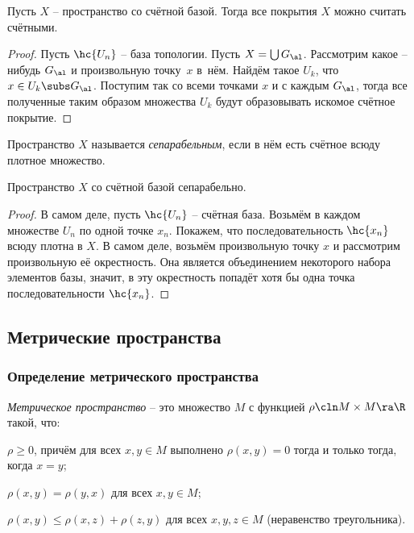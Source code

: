 \documentclass[a4paper]{article}
\begin{document}
\begin{stm}
Пусть $X$ -- пространство со счётной базой. Тогда все покрытия $X$ можно считать счётными.
\end{stm}
\begin{proof}
Пусть $\hc{U_n}$ -- база топологии. Пусть $X = \bigcup G_\al$. Рассмотрим какое -- нибудь
$G_\al$ и произвольную точку~$x$ в~нём. Найдём такое $U_k$, что $x \in U_k \subs G_\al$.
Поступим так со всеми точками $x$ и с каждым $G_\al$, тогда все полученные таким образом
множества $U_k$ будут образовывать искомое счётное покрытие.
\end{proof}

\begin{df}
Пространство $X$ называется \emph{сепарабельным}, если в нём есть счётное всюду плотное множество.
\end{df}


\begin{stm}
Пространство $X$ со счётной базой сепарабельно.
\end{stm}
\begin{proof}
В самом деле, пусть $\hc{U_n}$ -- счётная база. Возьмём в каждом множестве $U_n$
по одной точке $x_n$. Покажем, что последовательность $\hc{x_n}$ всюду плотна в $X$.
В самом деле, возьмём произвольную точку $x$ и рассмотрим произвольную её окрестность.
Она является объединением некоторого набора элементов базы, значит, в эту окрестность
попадёт хотя бы одна точка последовательности $\hc{x_n}$.
\end{proof}


\subsection{Метрические пространства}

\subsubsection{Определение метрического пространства}

\begin{df}
\emph{Метрическое пространство} -- это множество $M$ с функцией $\rho\cln M\times M \ra \R$ такой, что:
\begin{items}{-3}
\item $\rho \ge 0$, причём для всех $x, y\in M$ выполнено $\rho(x,y) = 0$ тогда и только тогда, когда $x = y$;
\item $\rho(x,y) = \rho(y,x)$ для всех $x, y \in M$;
\item $\rho(x,y) \le \rho(x,z) + \rho(z,y)$ для всех $x,y,z \in M$ (неравенство треугольника).
\end{items}
\end{df}
\end{document}
